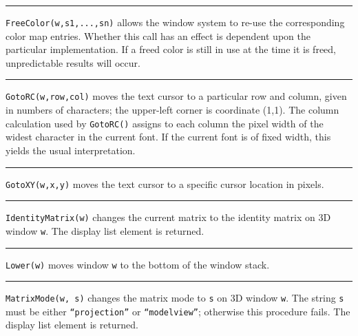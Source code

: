 \bigskip\hrule\vspace{0.1cm}

\noindent
\texttt{FreeColor(w,s1,...,sn)} allows the window system to re-use the
corresponding color map entries. Whether this call has an effect is
dependent upon the particular implementation. If a freed color is
still in use at the time it is freed, unpredictable results will occur.

\bigskip\hrule\vspace{0.1cm}

\noindent
\texttt{GotoRC(w,row,col)} moves the text cursor to a particular row and
column, given in numbers of characters; the upper-left corner is
coordinate (1,1). The column calculation used by \texttt{GotoRC()}
assigns to each column the pixel width of the widest character in the
current font. If the current font is of fixed width, this yields the
usual interpretation.

\bigskip\hrule\vspace{0.1cm}

\noindent
\texttt{GotoXY(w,x,y)} moves the text cursor to a specific cursor
location in pixels.

\bigskip\hrule\vspace{0.1cm}

\noindent
\texttt{IdentityMatrix(w)} changes the current matrix to the identity
matrix on 3D window \texttt{w}. The display list element is returned. 

\bigskip\hrule\vspace{0.1cm}

\noindent
\texttt{Lower(w)} moves window \texttt{w} to the bottom of the window
stack.

\bigskip\hrule\vspace{0.1cm}

\noindent
\texttt{MatrixMode(w, s)} changes the matrix mode to \texttt{s} on 3D
window \texttt{w}. The string \texttt{s} must be either
\texttt{{\textquotedblleft}projection{\textquotedblright}} or
\texttt{{\textquotedblleft}modelview{\textquotedblright}}; otherwise
this procedure fails. The display list element is returned.

